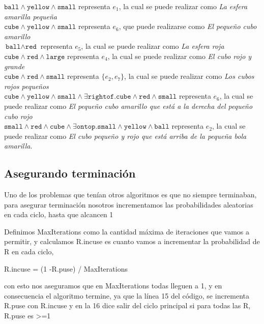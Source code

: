 $\texttt{ball} \wedge \texttt{yellow} \wedge \texttt{small}$ representa $e_1$, la cual se puede realizar como \textit{La esfera amarilla peque\~na} \\
$\texttt{cube} \wedge \texttt{yellow} \wedge \texttt{small}$ representa $e_6$, que puede realizarse como \textit{El peque\~no cubo amarillo} \\
$\texttt{ball} \wedge \texttt{red}$ representa $e_5$, la cual se puede realizar como \textit{La esfera roja} \\
$\texttt{cube} \wedge \texttt{red} \wedge \texttt{large}$ representa $e_4$, la cual se puede realizar como \textit{El cubo rojo y grande} \\
$\texttt{cube} \wedge \texttt{red} \wedge \texttt{small}$ representa $\{e_2,e_7\}$, la cual se puede realizar como \textit{Los cubos rojos peque\~nos}  \\
$\texttt{cube} \wedge \texttt{yellow} \wedge \texttt{small} \wedge \exists \texttt{rightof}. \texttt{cube} \wedge \texttt{red} \wedge \texttt{small}$ representa $e_6$, la cual se puede realizar como \textit{El peque\~no cubo amarillo que est\'a a la derecha del peque\~no cubo rojo} \\
$\texttt{small} \wedge \texttt{red} \wedge \texttt{cube} \wedge \exists \texttt{ontop}. \texttt{small} \wedge \texttt{yellow} \wedge \texttt{ball}$ representa $e_2$, la cual se puede realizar como \textit{El cubo peque\~no y rojo que est\'a arriba de la peque\~na bola amarilla}. \\



\subsection{Asegurando terminaci\'on}

Uno de los problemas que ten\'ian otros algoritmos es que no siempre terminaban, para asegurar terminaci\'on nosotros incrementamos las probabilidades aleatorias en cada ciclo, hasta que alcancen 1

Definimos MaxIterations como la cantidad m\'axima de iteraciones que vamos a permitir, y calculamos R.incuse es cuanto vamos a incrementar la probabilidad de R en cada ciclo, 

R.incuse = (1 -R.puse) / MaxIterations

con esto nos aseguramos que en MaxIterations todas lleguen a 1, y en consecuencia el algoritmo termine, ya que la l\'inea 15 del c\'odigo, se incrementa R.puse con R.incuse y en la 16 dice salir del ciclo principal si para todas las R, R.puse es >=1

